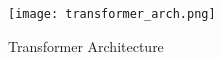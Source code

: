 \documentclass[licencjacka,en]{pracamgr}
\begin{document}
\begin{figure}
    \centering
    \texttt{[image: transformer\_arch.png]}
    \caption{Transformer Architecture \cite{attention}}
    \label{fig:transformers_fig}
\end{figure}


\end{document}

